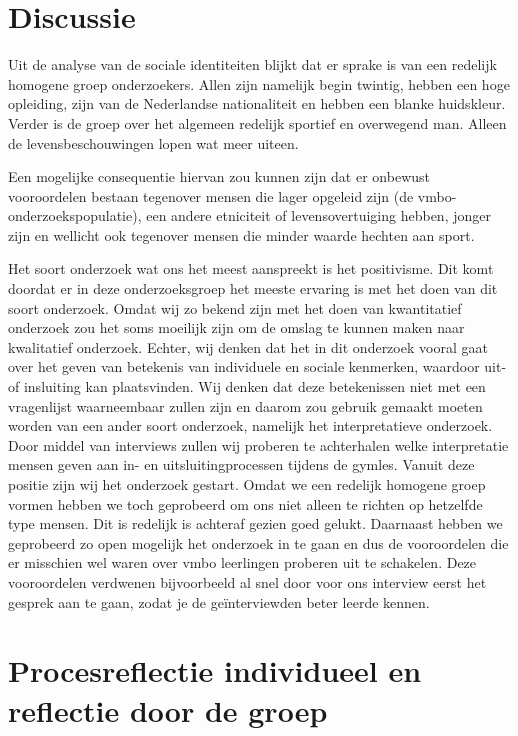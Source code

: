 \documentclass[a4paper,12pt]{memoir}
\begin{document}
\section{Discussie}

Uit de analyse van de sociale identiteiten blijkt dat er sprake is van een redelijk homogene groep onderzoekers. Allen zijn namelijk begin twintig, hebben een hoge opleiding, zijn van de Nederlandse nationaliteit en hebben een blanke huidskleur. Verder is de groep over het algemeen redelijk sportief en overwegend man. Alleen de levensbeschouwingen lopen wat meer uiteen.

Een mogelijke consequentie hiervan zou kunnen zijn dat er onbewust vooroordelen bestaan tegenover mensen die lager opgeleid zijn (de vmbo-onderzoeks\-popu\-latie), een andere etniciteit of levensovertuiging hebben, jonger zijn en wellicht ook tegenover mensen die minder waarde hechten aan sport.

Het soort onderzoek wat ons het meest aanspreekt is het positivisme. Dit komt doordat er in deze onderzoeksgroep het meeste ervaring is met het doen van dit soort onderzoek. Omdat wij zo bekend zijn met het doen van kwantitatief onderzoek zou het soms moeilijk zijn om de omslag te kunnen maken naar kwalitatief onderzoek. Echter, wij denken dat het in dit onderzoek vooral gaat over het geven van betekenis van individuele en sociale kenmerken, waardoor uit- of insluiting kan plaatsvinden. Wij denken dat deze betekenissen niet met een vragenlijst waarneembaar zullen zijn en daarom zou gebruik gemaakt moeten worden van een ander soort onderzoek, namelijk het interpretatieve onderzoek. Door middel van interviews zullen wij proberen te achterhalen welke interpretatie mensen geven aan in- en uitsluitingprocessen tijdens de gymles. Vanuit deze positie zijn wij het onderzoek gestart. Omdat we een redelijk homogene groep vormen hebben we toch geprobeerd om ons niet alleen te richten op hetzelfde type mensen. Dit is redelijk is achteraf gezien goed gelukt. Daarnaast hebben we geprobeerd zo open mogelijk het onderzoek in te gaan en dus de vooroordelen die er misschien wel waren over vmbo leerlingen proberen uit te schakelen. Deze vooroordelen verdwenen bijvoorbeeld al snel door voor ons interview eerst het gesprek aan te gaan, zodat je de geïnterviewden beter leerde kennen.

\section{Procesreflectie individueel en reflectie door de groep}
\end{document}
